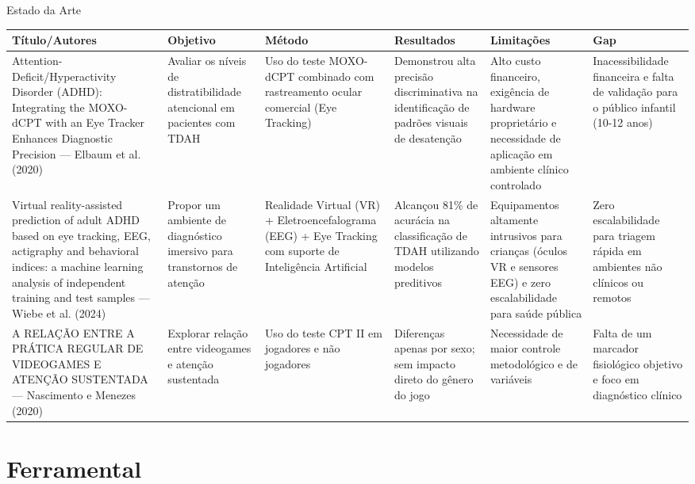 \documentclass[aspectratio=169]{beamer}
\begin{document}
\begin{frame}[t]{Estado da Arte}
  \scriptsize  
  \begin{table}
    \centering
    \tiny
    \begin{tabular}{|p{2.5cm}|p{2cm}|p{2cm}|p{2cm}|p{2cm}|p{1.5cm}|}
      \hline
      \textbf{Título/Autores} & \textbf{Objetivo} & \textbf{Método} & \textbf{Resultados} & \textbf{Limitações} & \textbf{Gap} \\
      \hline
      Attention-Deficit/Hyperactivity Disorder (ADHD): Integrating the MOXO-dCPT with an Eye Tracker Enhances Diagnostic Precision — Elbaum et al. (2020) & Avaliar os níveis de distratibilidade atencional em pacientes com TDAH & Uso do teste MOXO-dCPT combinado com rastreamento ocular comercial (Eye Tracking) & Demonstrou alta precisão discriminativa na identificação de padrões visuais de desatenção & Alto custo financeiro, exigência de hardware proprietário e necessidade de aplicação em ambiente clínico controlado & Inacessibilidade financeira e falta de validação para o público infantil (10-12 anos) \\
      \hline
      Virtual reality-assisted prediction of adult ADHD based on eye tracking, EEG, actigraphy and behavioral indices: a machine learning analysis of independent training and test samples — Wiebe et al. (2024) & Propor um ambiente de diagnóstico imersivo para transtornos de atenção & Realidade Virtual (VR) + Eletroencefalograma (EEG) + Eye Tracking com suporte de Inteligência Artificial & Alcançou 81\% de acurácia na classificação de TDAH utilizando modelos preditivos & Equipamentos altamente intrusivos para crianças (óculos VR e sensores EEG) e zero escalabilidade para saúde pública & Zero escalabilidade para triagem rápida em ambientes não clínicos ou remotos \\
      \hline
      A RELAÇÃO ENTRE A PRÁTICA REGULAR DE VIDEOGAMES E ATENÇÃO SUSTENTADA — Nascimento e Menezes (2020) &Explorar relação entre videogames e atenção sustentada & Uso do teste CPT II em jogadores e não jogadores & Diferenças apenas por sexo; sem impacto direto do gênero do jogo & Necessidade de maior controle metodológico e de variáveis & Falta de um marcador fisiológico objetivo e foco em diagnóstico clínico \\
      \hline
    \end{tabular}
  \end{table}
\end{frame}

\section{Ferramental}
\end{document}
